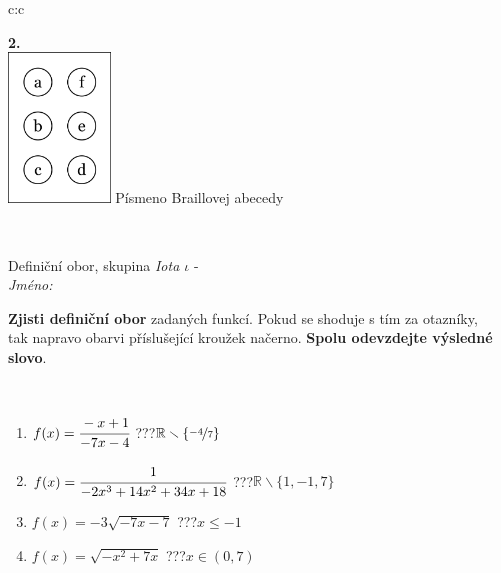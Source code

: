 \documentclass[10pt]{report}
\begin{document}
\begin{tabular}{c:c}
\begin{minipage}[c][104.5mm][t]{0.5\linewidth}
\begin{center}
\begin{minipage}{0.20\linewidth}
\begin{center}
{\Huge\bfseries 2.} \\[2mm]
\includegraphics[height=40mm]{../images/braille.png}
{\small Písmeno Braillovej abecedy}
\end{center}
\end{minipage}
\end{center}
\end{minipage}
\\ \hdashline
\begin{minipage}[c][104.5mm][t]{0.5\linewidth}
\begin{center}
\vspace{7mm}
{\huge Definiční obor, skupina \textit{Iota $\iota$} -}\\[5mm]
\textit{Jméno:}\phantom{xxxxxxxxxxxxxxxxxxxxxxxxxxxxxxxxxxxxxxxxxxxxxxxxxxxxxxxxxxxxxxxxx}\\[5mm]
\begin{minipage}{0.95\linewidth}
\begin{center}
\textbf{Zjisti definiční obor} zadaných funkcí. Pokud se shoduje s tím za otazníky,\\tak napravo obarvi příslušející kroužek načerno. \textbf{Spolu odevzdejte výsledné slovo}.
\end{center}
\end{minipage}
\\[1mm]
\begin{minipage}{0.79\linewidth}
\begin{center}
\begin{varwidth}{\linewidth}
\begin{enumerate}
\normalsizerrr
\item $f(x)=\cfrac{-x+1}{-7x-4}$\quad \dotfill\; ???\;\dotfill \quad $\mathbb{R}\smallsetminus\{\nicefrac{-4}{7}\}$
\item $f(x)=\cfrac{1}{-2x^3+14x^2+34x+18}$\quad \dotfill\; ???\;\dotfill \quad $\mathbb{R}\smallsetminus\{1,-1,7\}$
\item $f(x)=-3\sqrt{-7x-7}$\quad \dotfill\; ???\;\dotfill \quad $x\leq-1$
\item $f(x)=\sqrt{-x^2+7x}$\quad \dotfill\; ???\;\dotfill \quad $x\in(0 , 7)$

\end{enumerate}
\end{varwidth}
\end{center}
\end{minipage}
\end{center}
\end{minipage}
\end{tabular}
\end{document}
